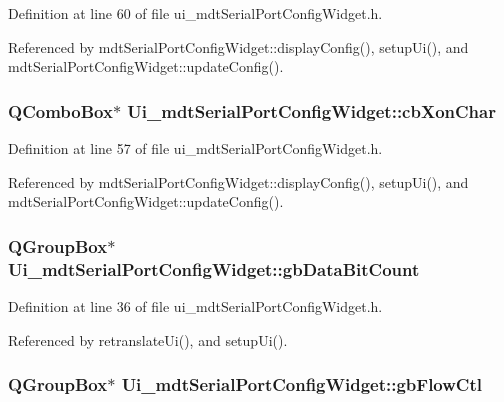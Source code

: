 Definition at line 60 of file ui\-\_\-mdt\-Serial\-Port\-Config\-Widget.\-h.



Referenced by mdt\-Serial\-Port\-Config\-Widget\-::display\-Config(), setup\-Ui(), and mdt\-Serial\-Port\-Config\-Widget\-::update\-Config().

\hypertarget{class_ui__mdt_serial_port_config_widget_aef30953026911eeac301427dbf46a19f}{
\subsubsection[{cb\-Xon\-Char}]{\setlength{\rightskip}{0pt plus 5cm}Q\-Combo\-Box$\ast$ Ui\-\_\-mdt\-Serial\-Port\-Config\-Widget\-::cb\-Xon\-Char}}\label{class_ui__mdt_serial_port_config_widget_aef30953026911eeac301427dbf46a19f}


Definition at line 57 of file ui\-\_\-mdt\-Serial\-Port\-Config\-Widget.\-h.



Referenced by mdt\-Serial\-Port\-Config\-Widget\-::display\-Config(), setup\-Ui(), and mdt\-Serial\-Port\-Config\-Widget\-::update\-Config().

\hypertarget{class_ui__mdt_serial_port_config_widget_a93e418f3a8968563f9d76deaa0277e2b}{
\subsubsection[{gb\-Data\-Bit\-Count}]{\setlength{\rightskip}{0pt plus 5cm}Q\-Group\-Box$\ast$ Ui\-\_\-mdt\-Serial\-Port\-Config\-Widget\-::gb\-Data\-Bit\-Count}}\label{class_ui__mdt_serial_port_config_widget_a93e418f3a8968563f9d76deaa0277e2b}


Definition at line 36 of file ui\-\_\-mdt\-Serial\-Port\-Config\-Widget.\-h.



Referenced by retranslate\-Ui(), and setup\-Ui().

\hypertarget{class_ui__mdt_serial_port_config_widget_a4b5b85d8c299bde92ef95cba4d644357}{
\subsubsection[{gb\-Flow\-Ctl}]{\setlength{\rightskip}{0pt plus 5cm}Q\-Group\-Box$\ast$ Ui\-\_\-mdt\-Serial\-Port\-Config\-Widget\-::gb\-Flow\-Ctl}}\label{class_ui__mdt_serial_port_config_widget_a4b5b85d8c299bde92ef95cba4d644357}


